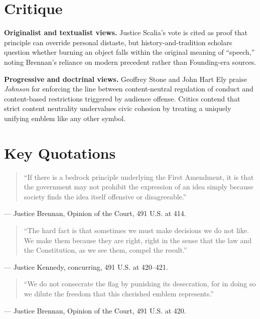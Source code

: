 \documentclass[12pt]{article}
\begin{document}
\section{Critique}

\textbf{Originalist and textualist views.} Justice Scalia's vote is cited as proof that principle can override personal distaste, but history-and-tradition scholars question whether burning an object falls within the original meaning of ``speech,'' noting Brennan's reliance on modern precedent rather than Founding-era sources.

\textbf{Progressive and doctrinal views.} Geoffrey Stone and John Hart Ely praise \textit{Johnson} for enforcing the line between content-neutral regulation of conduct and content-based restrictions triggered by audience offense. Critics contend that strict content neutrality undervalues civic cohesion by treating a uniquely unifying emblem like any other symbol.

\section{Key Quotations}

\begin{quote}
``If there is a bedrock principle underlying the First Amendment, it is that the government may not prohibit the expression of an idea simply because society finds the idea itself offensive or disagreeable.''
\end{quote}
\noindent --- Justice Brennan, Opinion of the Court, 491 U.S. at 414.

\begin{quote}
``The hard fact is that sometimes we must make decisions we do not like. We make them because they are right, right in the sense that the law and the Constitution, as we see them, compel the result.''
\end{quote}
\noindent --- Justice Kennedy, concurring, 491 U.S. at 420--421.

\begin{quote}
``We do not consecrate the flag by punishing its desecration, for in doing so we dilute the freedom that this cherished emblem represents.''
\end{quote}
\noindent --- Justice Brennan, Opinion of the Court, 491 U.S. at 420.
\end{document}
